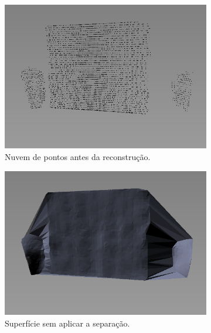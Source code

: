 \begin{figure}[H]
    \centering
    \caption{Processo de remoção das sub-malhas.}
    \begin{subfigure}[t]{0.4\textwidth}
        \includegraphics[width=\textwidth]{dados/figuras/split_mesh1.png}
        \caption{Nuvem de pontos antes da reconstrução.}
        \label{fig:split_mesh1}
    \end{subfigure}
    \begin{subfigure}[t]{0.4\textwidth}
        \includegraphics[width=\textwidth]{dados/figuras/split_mesh2.png}
        \caption{Superfície sem aplicar a separação.}
        \label{fig:split_mesh2}
    \end{subfigure}
    \begin{subfigure}[t]{0.4\textwidth}

\end{subfigure}
\end{figure}
